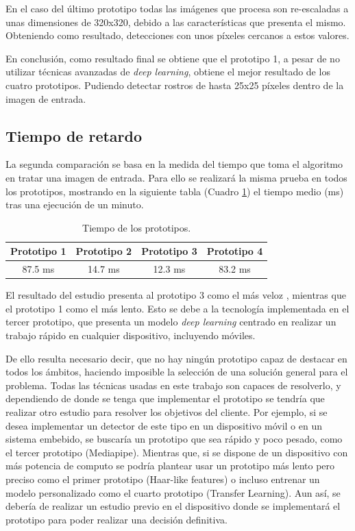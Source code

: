 En el caso del último prototipo todas las imágenes que procesa son re-escaladas a unas dimensiones de 320x320, debido a las características que presenta el mismo. Obteniendo como resultado, detecciones con unos píxeles cercanos a estos valores.

En conclusión, como resultado final se obtiene que el prototipo 1, a pesar de no utilizar técnicas avanzadas de \textit{deep learning}, obtiene el mejor resultado de los cuatro prototipos. Pudiendo detectar rostros de hasta 25x25 píxeles dentro de la imagen de entrada.

\vspace{-0.5cm}
\subsection*{Tiempo de retardo}
\vspace{-0.5cm}

La segunda comparación se basa en la medida del tiempo que toma el algoritmo en tratar una imagen de entrada. Para ello se realizará la misma prueba en todos los prototipos, mostrando en la siguiente tabla (Cuadro \ref{tab:table4}) el tiempo medio (ms) tras una ejecución de un minuto.

\begin{table}[h!]
	\begin{center}
		\begin{tabular}{ |c|c|c|c| } 
			\hline
			\textbf{Prototipo 1} & \textbf{Prototipo 2} & \textbf{Prototipo 3} & \textbf{Prototipo 4} \\
			\hline
			87.5 ms & 14.7 ms  & 12.3 ms & 83.2 ms \\
			\hline
		\end{tabular}
		\caption{Tiempo de los prototipos.}
		\label{tab:table4}
	\end{center}
\end{table}

El resultado del estudio presenta al prototipo 3 como el más veloz , mientras que el prototipo 1 como el más lento. Esto se debe a la tecnología implementada en el tercer prototipo, que presenta un modelo \textit{deep learning} centrado en realizar un trabajo rápido en cualquier dispositivo, incluyendo móviles.

De ello resulta necesario decir, que no hay ningún prototipo capaz de destacar en todos los ámbitos, haciendo imposible la selección de una solución general para el problema. Todas las técnicas usadas en este trabajo son capaces de resolverlo, y dependiendo de donde se tenga que implementar el prototipo se tendría que realizar otro estudio para resolver los objetivos del cliente. Por ejemplo,  si se desea implementar un detector de este tipo en un dispositivo móvil o en un sistema embebido, se buscaría un prototipo que sea rápido y poco pesado, como el tercer prototipo (Mediapipe). Mientras que, si se dispone de un dispositivo con más potencia de computo se podría plantear usar un prototipo más lento pero preciso como el primer prototipo (Haar-like features) o incluso entrenar un modelo personalizado como el cuarto prototipo (Transfer Learning). Aun así, se debería de realizar un estudio previo en el dispositivo donde se implementará el prototipo para poder realizar una decisión definitiva.  


